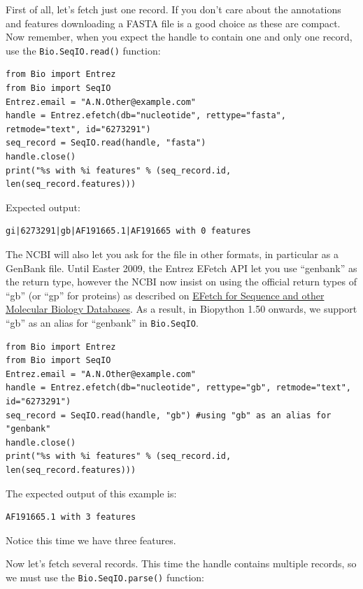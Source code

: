 \documentclass{report}
\begin{document}
First of all, let's fetch just one record.  If you don't care about the
annotations and features downloading a FASTA file is a good choice as these
are compact.  Now remember, when you expect the handle to contain one and
only one record, use the \verb|Bio.SeqIO.read()| function:

\begin{verbatim}
from Bio import Entrez
from Bio import SeqIO
Entrez.email = "A.N.Other@example.com"
handle = Entrez.efetch(db="nucleotide", rettype="fasta", retmode="text", id="6273291")
seq_record = SeqIO.read(handle, "fasta")
handle.close()
print("%s with %i features" % (seq_record.id, len(seq_record.features)))
\end{verbatim}

\noindent Expected output:

\begin{verbatim}
gi|6273291|gb|AF191665.1|AF191665 with 0 features
\end{verbatim}

The NCBI will also let you ask for the file in other formats, in particular as
a GenBank file. Until Easter 2009, the Entrez EFetch API let you use ``genbank''
as the return type, however the NCBI now insist on using the official
return types of ``gb'' (or ``gp'' for proteins) as described on
\href{http://www.ncbi.nlm.nih.gov/entrez/query/static/efetchseq_help.html}
{EFetch for Sequence and other Molecular Biology Databases}.
As a result, in Biopython 1.50 onwards, we support ``gb'' as an
alias for ``genbank'' in \verb|Bio.SeqIO|.

\begin{verbatim}
from Bio import Entrez
from Bio import SeqIO
Entrez.email = "A.N.Other@example.com"
handle = Entrez.efetch(db="nucleotide", rettype="gb", retmode="text", id="6273291")
seq_record = SeqIO.read(handle, "gb") #using "gb" as an alias for "genbank"
handle.close()
print("%s with %i features" % (seq_record.id, len(seq_record.features)))
\end{verbatim}

\noindent The expected output of this example is:

\begin{verbatim}
AF191665.1 with 3 features
\end{verbatim}

\noindent Notice this time we have three features.

Now let's fetch several records.  This time the handle contains multiple records,
so we must use the \verb|Bio.SeqIO.parse()| function:
\end{document}
